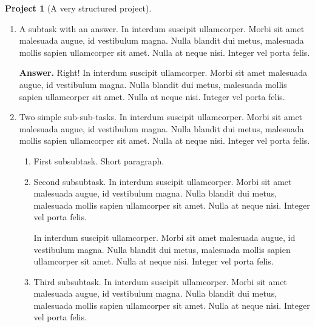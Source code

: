 \documentclass[10pt,]{article}
\theoremstyle{plain}
\theoremstyle{definition}
\theoremstyle{definition}
\theoremstyle{definition}
\theoremstyle{definition}
\newtheorem{project}{Project}[section]
\theoremstyle{definition}
\theoremstyle{definition}
\numberwithin{equation}{section}
\begin{document}
\begin{project}[A very structured project]
\begin{enumerate}[font=\bfseries,label=(\alph*),ref=\alph*]
\begin{enumerate}[font=\bfseries,label=(\roman*),ref=\theenumi.\roman*]
\par
\hypertarget{p-87}{}%
A short paragraph, before an answer.%
\par\smallskip%
\noindent\textbf{Answer.}\hypertarget{answer-3}{}\quad%
\hypertarget{p-88}{}%
In interdum suscipit ullamcorper. Morbi sit amet malesuada augue, id vestibulum magna. Nulla blandit dui metus, malesuada mollis sapien ullamcorper sit amet. Nulla at neque nisi. Integer vel porta felis.%
\item\label{task-5} \hypertarget{p-89}{}%
A subtask with an answer.  In interdum suscipit ullamcorper. Morbi sit amet malesuada augue, id vestibulum magna. Nulla blandit dui metus, malesuada mollis sapien ullamcorper sit amet. Nulla at neque nisi. Integer vel porta felis.%
\par\smallskip%
\noindent\textbf{Answer.}\hypertarget{answer-4}{}\quad%
\hypertarget{p-90}{}%
Right!  In interdum suscipit ullamcorper. Morbi sit amet malesuada augue, id vestibulum magna. Nulla blandit dui metus, malesuada mollis sapien ullamcorper sit amet. Nulla at neque nisi. Integer vel porta felis.%
\item\label{project-task-level-two} \hypertarget{p-91}{}%
Two simple sub-sub-tasks.  In interdum suscipit ullamcorper. Morbi sit amet malesuada augue, id vestibulum magna. Nulla blandit dui metus, malesuada mollis sapien ullamcorper sit amet. Nulla at neque nisi. Integer vel porta felis.%
\begin{enumerate}[font=\bfseries,label=(\Alph*),ref=\theenumi.\theenumii.\Alph*]
\item\label{task-7} \hypertarget{p-92}{}%
First subsubtask.  Short paragraph.%
\item\label{task-8} \hypertarget{p-93}{}%
Second subsubtask.  In interdum suscipit ullamcorper. Morbi sit amet malesuada augue, id vestibulum magna. Nulla blandit dui metus, malesuada mollis sapien ullamcorper sit amet. Nulla at neque nisi. Integer vel porta felis.%
\par
\hypertarget{p-94}{}%
In interdum suscipit ullamcorper. Morbi sit amet malesuada augue, id vestibulum magna. Nulla blandit dui metus, malesuada mollis sapien ullamcorper sit amet. Nulla at neque nisi. Integer vel porta felis.%
\item\label{task-9} \hypertarget{p-95}{}%
Third subsubtask.  In interdum suscipit ullamcorper. Morbi sit amet malesuada augue, id vestibulum magna. Nulla blandit dui metus, malesuada mollis sapien ullamcorper sit amet. Nulla at neque nisi. Integer vel porta felis.%
\par

\end{enumerate}
\end{enumerate}
\end{enumerate}
\end{project}
\end{document}
